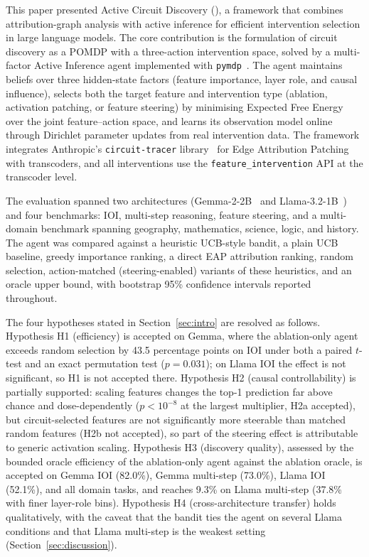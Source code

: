 
This paper presented Active Circuit Discovery (\ACD), a framework that combines
attribution-graph analysis with active inference for efficient intervention
selection in large language models. The core contribution is the formulation of
circuit discovery as a POMDP with a three-action intervention space, solved by a
multi-factor Active Inference agent implemented with \texttt{pymdp}~\cite{Pymdp2022}.
The agent maintains beliefs over three hidden-state factors (feature importance,
layer role, and causal influence), selects both the target feature and
intervention type (ablation, activation patching, or feature steering) by
minimising Expected Free Energy over the joint feature--action space, and learns
its observation model online through Dirichlet parameter updates from real
intervention data. The framework integrates Anthropic's \texttt{circuit-tracer}
library~\cite{Anthropic2025CT} for Edge Attribution Patching with transcoders, and
all interventions use the \texttt{feature\_intervention} API at the transcoder
level.

The evaluation spanned two architectures (Gemma-2-2B~\cite{team2024gemma} and
Llama-3.2-1B~\cite{Dubey2024llama}) and four benchmarks: IOI, multi-step reasoning,
feature steering, and a multi-domain benchmark spanning geography, mathematics,
science, logic, and history. The agent was compared against a heuristic UCB-style
bandit, a plain UCB baseline, greedy importance ranking, a direct EAP attribution
ranking, random selection, action-matched (steering-enabled) variants of these
heuristics, and an oracle upper bound, with bootstrap 95\% confidence intervals
reported throughout.

The four hypotheses stated in Section~\ref{sec:intro} are resolved as follows.
Hypothesis H1 (efficiency) is accepted on Gemma, where the ablation-only agent
exceeds random selection by 43.5 percentage points on IOI under both a paired
$t$-test and an exact permutation test ($p=0.031$); on Llama IOI the effect is not
significant, so H1 is not accepted there. Hypothesis H2 (causal controllability)
is partially supported: scaling features changes the top-1 prediction far above
chance and dose-dependently ($p<10^{-8}$ at the largest multiplier, H2a accepted),
but circuit-selected features are not significantly more steerable than matched
random features (H2b not accepted), so part of the steering effect is attributable
to generic activation scaling. Hypothesis H3 (discovery quality), assessed by the
bounded oracle efficiency of the ablation-only agent against the ablation oracle,
is accepted on Gemma IOI (82.0\%), Gemma multi-step (73.0\%), Llama IOI (52.1\%),
and all domain tasks, and reaches 9.3\% on Llama multi-step (37.8\% with finer
layer-role bins). Hypothesis H4 (cross-architecture transfer) holds qualitatively,
with the caveat that the bandit ties the agent on several Llama conditions and that
Llama multi-step is the weakest setting (Section~\ref{sec:discussion}).

